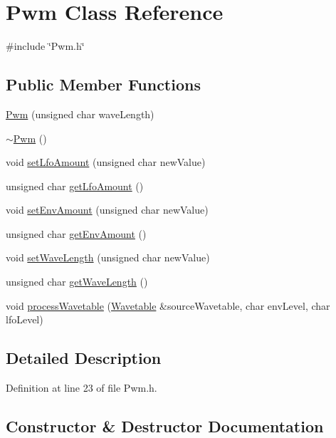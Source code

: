 \hypertarget{class_pwm}{}\section{Pwm Class Reference}
\label{class_pwm}


{\ttfamily \#include \char`\"{}Pwm.\+h\char`\"{}}

\subsection*{Public Member Functions}
\begin{DoxyCompactItemize}
\item 
\hyperlink{class_pwm_af73e0bd2862428ffc7feebc0c11de5dd}{Pwm} (unsigned char wave\+Length)
\item 
\hyperlink{class_pwm_ac97d5b9a021ea218147206706e368a22}{$\sim$\+Pwm} ()
\item 
void \hyperlink{class_pwm_a1fe2ceb8636015244b4d3ed7ef15b333}{set\+Lfo\+Amount} (unsigned char new\+Value)
\item 
unsigned char \hyperlink{class_pwm_a7b41dfa02ff30f6260b81c75627ed333}{get\+Lfo\+Amount} ()
\item 
void \hyperlink{class_pwm_acda631e927e79a31dd2fc0e0116c88fc}{set\+Env\+Amount} (unsigned char new\+Value)
\item 
unsigned char \hyperlink{class_pwm_ada7e7bc3b17ee5fe5fb7af5379486e8e}{get\+Env\+Amount} ()
\item 
void \hyperlink{class_pwm_a65828f1098ab41b17141dd614aa420ec}{set\+Wave\+Length} (unsigned char new\+Value)
\item 
unsigned char \hyperlink{class_pwm_a8d525e1a70c9a96c3a0ab4b0307da953}{get\+Wave\+Length} ()
\item 
void \hyperlink{class_pwm_a51b2ea74a5b67115148141a843cddca1}{process\+Wavetable} (\hyperlink{class_wavetable}{Wavetable} \&source\+Wavetable, char env\+Level, char lfo\+Level)
\end{DoxyCompactItemize}


\subsection{Detailed Description}


Definition at line 23 of file Pwm.\+h.



\subsection{Constructor \& Destructor Documentation}
\mbox{\label{class_pwm_af73e0bd2862428ffc7feebc0c11de5dd}} 
